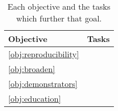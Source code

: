 \begin{table}
  \label{tab:objectives-tasks}
  \caption{
  Each objective and the tasks which further that goal.}
  \begin{tabular}{|m{}|m{}|}

    \hline

    \textbf{Objective} & \textbf{Tasks}
    \\\hline

    \ref{obj:reproducibility} &


    \\\hline

    \ref{obj:broaden} &


    \\\hline

    \ref{obj:demonstrators} &

    \\\hline

    \ref{obj:education} &


    \\\hline

  \end{tabular}
\end{table}
